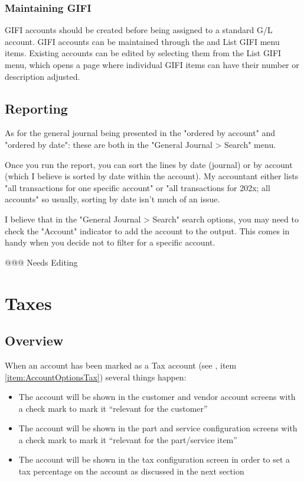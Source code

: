 \subsection{Maintaining GIFI}
\label{subsec-coa-gifi-maintenance}

GIFI accounts should be created before being assigned to a standard G/L account. GIFI accounts
can be maintained through the  and List GIFI menu items. Existing accounts can be edited by selecting them from the List GIFI menu, which opens a page where individual GIFI items can have their number or
description adjusted.

\section{Reporting}
\label{sec-coa-reporting}

As for the general journal being presented in the "ordered by account" and "ordered by date": these are both in the "General Journal > Search" menu. 

Once you run the report, you can sort the lines by date (journal) or by account (which I believe is sorted by date within the account).
My accountant either lists "all transactions for one specific account" or "all transactions for 202x; all accounts"
so usually, sorting by date isn't much of an issue.

I believe that in the "General Journal > Search" search options, you may need to check the "Account" indicator to add the account to the output. This comes in handy when you decide not to filter for a specific account.

@@@ Needs Editing

\chapter{Taxes}
\label{cha-taxes}

\section{Overview}
\label{sec-tax-overview}

When an account has been marked as a Tax account (see , item
\ref{item:AccountOptionsTax}) several things happen:

\begin{itemize}
\item The account will be shown in the \gls{customer} and vendor account screens with
   a check mark to mark it ``relevant for the customer''
\item The account will be shown in the part and service configuration screens
   with a check mark to mark it ``relevant for the part/service item''
\item The account will be shown in the tax configuration screen in order to set
   a tax percentage on the account as discussed in the next section
\end{itemize}

